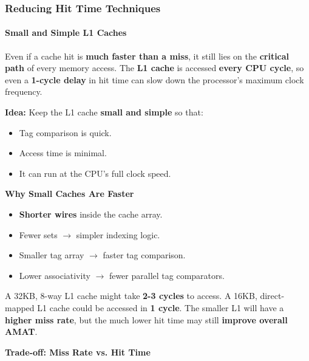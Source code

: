 \subsubsection{Reducing Hit Time Techniques}

\paragraph{Small and Simple L1 Caches}

Even if a cache hit is \textbf{much faster than a miss}, it still lies on the \textbf{critical path} of every memory access. The \textbf{L1 cache} is accessed \textbf{every CPU cycle}, so even a \textbf{1-cycle delay} in hit time can slow down the processor's maximum clock frequency.

\highspace
\textcolor{Green3}{ \textbf{Idea:}} Keep the L1 cache \textbf{small and simple} so that:
\begin{itemize}
    \item Tag comparison is quick.
    \item Access time is minimal.
    \item It can run at the CPU's full clock speed.
\end{itemize}

\begin{flushleft}
    \textcolor{Green3}{\faIcon{\speedIcon} \textbf{Why Small Caches Are Faster}}
\end{flushleft}
\begin{itemize}
    \item \textbf{Shorter wires} inside the cache array.
    \item Fewer sets $\rightarrow$ simpler indexing logic.
    \item Smaller tag array $\rightarrow$ faster tag comparison.
    \item Lower associativity $\rightarrow$ fewer parallel tag comparators.
\end{itemize}

\begin{examplebox}
    A 32KB, 8-way L1 cache might take \textbf{2-3 cycles} to access.
    A 16KB, direct-mapped L1 cache could be accessed in \textbf{1 cycle}.
    The smaller L1 will have a \textbf{higher miss rate}, but the much lower hit time may still \textbf{improve overall AMAT}.
\end{examplebox}

\begin{flushleft}
    \textcolor{Green3}{ \textbf{Trade-off: Miss Rate vs. Hit Time}}
\end{flushleft}

